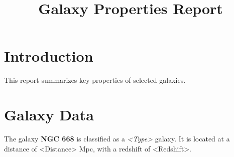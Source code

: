 \documentclass{article}
\title{Galaxy Properties Report}
\author{}
\date{}
\begin{document}
\maketitle

\section{Introduction}
This report summarizes key properties of selected galaxies.

\section{Galaxy Data}
The galaxy \textbf{NGC 668} is classified as a \textit{<Type>} galaxy. 
It is located at a distance of <Distance> Mpc, with a redshift of <Redshift>.
\end{document}
